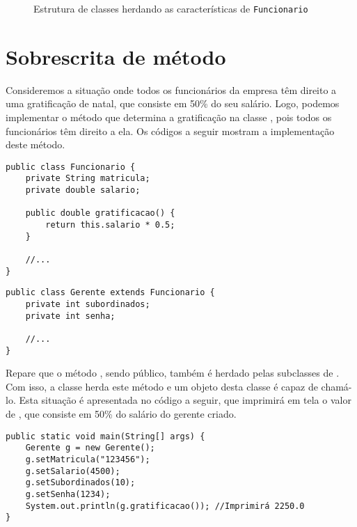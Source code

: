 \begin{figure}[h]
	\centering
	
	
	\caption{Estrutura de classes herdando as características de \texttt{Funcionario}}
	\label{fig:heranca-funcionario-varios}
\end{figure}
 

\section{Sobrescrita de método}

Consideremos a situação onde todos os funcionários da empresa têm direito a uma gratificação de natal, que consiste em 50\% do seu salário. Logo, podemos implementar o método que determina a gratificação na classe , pois todos os funcionários têm direito a ela. Os códigos a seguir mostram a implementação deste método. 
 
\begin{verbatim}
public class Funcionario {
	private String matricula;
	private double salario;

	public double gratificacao() {
		return this.salario * 0.5;
	}

	//...
}
\end{verbatim}
 
\begin{verbatim}
public class Gerente extends Funcionario {
	private int subordinados;
	private int senha;

	//...
}
\end{verbatim}
 
Repare que o método , sendo público, também é herdado pelas subclasses de . Com isso, a classe  herda este método e um objeto desta classe é capaz de chamá-lo. Esta situação é apresentada no código a seguir, que imprimirá em tela o valor de , que consiste em 50\% do salário do gerente criado.
 
\begin{verbatim}
public static void main(String[] args) {
	Gerente g = new Gerente();
	g.setMatricula("123456");
	g.setSalario(4500);
	g.setSubordinados(10);
	g.setSenha(1234);
	System.out.println(g.gratificacao()); //Imprimirá 2250.0
}
\end{verbatim}
 
